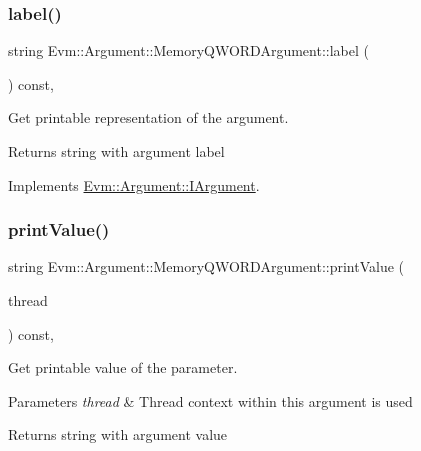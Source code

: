 \subsubsection{\texorpdfstring{label()}{label()}}
{\footnotesize\ttfamily string Evm\+::\+Argument\+::\+Memory\+Q\+W\+O\+R\+D\+Argument\+::label (\begin{DoxyParamCaption}{ }\end{DoxyParamCaption}) const\hspace{0.3cm}{\ttfamily [override]}, {\ttfamily [virtual]}}



Get printable representation of the argument. 

\begin{DoxyReturn}{Returns}
string with argument label 
\end{DoxyReturn}


Implements \mbox{\hyperlink{struct_evm_1_1_argument_1_1_i_argument_a35bdae816e89f6f9fc393b6e03c5e521}{Evm\+::\+Argument\+::\+I\+Argument}}.

\mbox{\label{struct_evm_1_1_argument_1_1_memory_q_w_o_r_d_argument_a428099eec7efa97b28a07f9b4d1a257b}} 
\subsubsection{\texorpdfstring{print\+Value()}{printValue()}}
{\footnotesize\ttfamily string Evm\+::\+Argument\+::\+Memory\+Q\+W\+O\+R\+D\+Argument\+::print\+Value (\begin{DoxyParamCaption}\item[{\mbox{\hyperlink{struct_evm_1_1_thread_context}{Thread\+Context}} \&}]{thread }\end{DoxyParamCaption}) const\hspace{0.3cm}{\ttfamily [override]}, {\ttfamily [virtual]}}



Get printable value of the parameter. 


\begin{DoxyParams}{Parameters}
{\em thread} & Thread context within this argument is used \\
\hline
\end{DoxyParams}
\begin{DoxyReturn}{Returns}
string with argument value 
\end{DoxyReturn}


